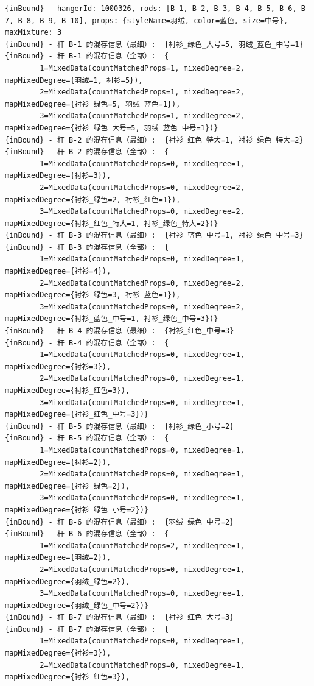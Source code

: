 {\begin{verbatim}
{inBound} - hangerId: 1000326, rods: [B-1, B-2, B-3, B-4, B-5, B-6, B-7, B-8, B-9, B-10], props: {styleName=羽绒, color=蓝色, size=中号}, maxMixture: 3
{inBound} - 杆 B-1 的混存信息（最细）:  {衬衫_绿色_大号=5, 羽绒_蓝色_中号=1}
{inBound} - 杆 B-1 的混存信息（全部）:  {
		1=MixedData(countMatchedProps=1, mixedDegree=2, mapMixedDegree={羽绒=1, 衬衫=5}), 
		2=MixedData(countMatchedProps=1, mixedDegree=2, mapMixedDegree={衬衫_绿色=5, 羽绒_蓝色=1}), 
		3=MixedData(countMatchedProps=1, mixedDegree=2, mapMixedDegree={衬衫_绿色_大号=5, 羽绒_蓝色_中号=1})}
{inBound} - 杆 B-2 的混存信息（最细）:  {衬衫_红色_特大=1, 衬衫_绿色_特大=2}
{inBound} - 杆 B-2 的混存信息（全部）:  {
		1=MixedData(countMatchedProps=0, mixedDegree=1, mapMixedDegree={衬衫=3}), 
		2=MixedData(countMatchedProps=0, mixedDegree=2, mapMixedDegree={衬衫_绿色=2, 衬衫_红色=1}), 
		3=MixedData(countMatchedProps=0, mixedDegree=2, mapMixedDegree={衬衫_红色_特大=1, 衬衫_绿色_特大=2})}
{inBound} - 杆 B-3 的混存信息（最细）:  {衬衫_蓝色_中号=1, 衬衫_绿色_中号=3}
{inBound} - 杆 B-3 的混存信息（全部）:  {
		1=MixedData(countMatchedProps=0, mixedDegree=1, mapMixedDegree={衬衫=4}), 
		2=MixedData(countMatchedProps=0, mixedDegree=2, mapMixedDegree={衬衫_绿色=3, 衬衫_蓝色=1}), 
		3=MixedData(countMatchedProps=0, mixedDegree=2, mapMixedDegree={衬衫_蓝色_中号=1, 衬衫_绿色_中号=3})}
{inBound} - 杆 B-4 的混存信息（最细）:  {衬衫_红色_中号=3}
{inBound} - 杆 B-4 的混存信息（全部）:  {
		1=MixedData(countMatchedProps=0, mixedDegree=1, mapMixedDegree={衬衫=3}), 
		2=MixedData(countMatchedProps=0, mixedDegree=1, mapMixedDegree={衬衫_红色=3}), 
		3=MixedData(countMatchedProps=0, mixedDegree=1, mapMixedDegree={衬衫_红色_中号=3})}
{inBound} - 杆 B-5 的混存信息（最细）:  {衬衫_绿色_小号=2}
{inBound} - 杆 B-5 的混存信息（全部）:  {
		1=MixedData(countMatchedProps=0, mixedDegree=1, mapMixedDegree={衬衫=2}), 
		2=MixedData(countMatchedProps=0, mixedDegree=1, mapMixedDegree={衬衫_绿色=2}), 
		3=MixedData(countMatchedProps=0, mixedDegree=1, mapMixedDegree={衬衫_绿色_小号=2})}
{inBound} - 杆 B-6 的混存信息（最细）:  {羽绒_绿色_中号=2}
{inBound} - 杆 B-6 的混存信息（全部）:  {
		1=MixedData(countMatchedProps=2, mixedDegree=1, mapMixedDegree={羽绒=2}), 
		2=MixedData(countMatchedProps=0, mixedDegree=1, mapMixedDegree={羽绒_绿色=2}), 
		3=MixedData(countMatchedProps=0, mixedDegree=1, mapMixedDegree={羽绒_绿色_中号=2})}
{inBound} - 杆 B-7 的混存信息（最细）:  {衬衫_红色_大号=3}
{inBound} - 杆 B-7 的混存信息（全部）:  {
		1=MixedData(countMatchedProps=0, mixedDegree=1, mapMixedDegree={衬衫=3}), 
		2=MixedData(countMatchedProps=0, mixedDegree=1, mapMixedDegree={衬衫_红色=3}), 

\end{verbatim}}
